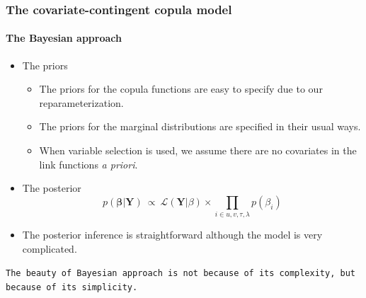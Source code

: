 \documentclass{beamer}
\begin{document}





\begin{frame}
  \frametitle{The covariate-contingent copula model}
  \framesubtitle{The Bayesian approach}
  \begin{itemize}

  \item The priors

    \begin{itemize}

    \item The priors for the copula functions are easy to specify due to our
      reparameterization.

    \item  The priors for the marginal distributions are specified in their usual
      ways.

    \item When variable selection is used, we assume there are no covariates in
      the link functions \emph{a priori}.

    \end{itemize}

  \item The posterior
    \begin{equation*}
      p(\bm{\beta}|\bm{Y})~ \propto~ \mathcal{L} (\mathbf{Y}| \beta) \times
      \prod \limits_{i \in u,v,\tau,\lambda} p(\beta_i)
    \end{equation*}

  \item The posterior inference is straightforward although the model is very complicated.
  \end{itemize}
\end{frame}

\begin{frame}[plain]
  \addtocounter{framenumber}{-1}

  \begin{center}
    \texttt{The beauty of Bayesian approach is not because of its complexity, but
      because of its simplicity.}

  \end{center}

\end{frame}
\end{document}
